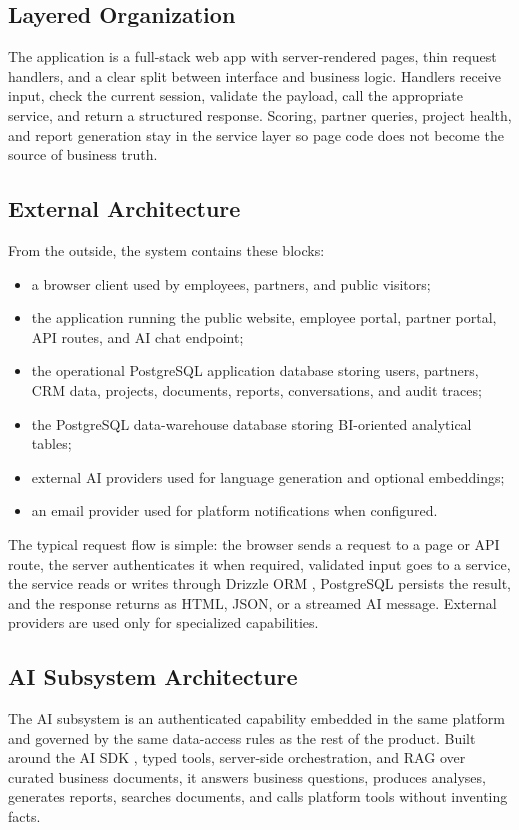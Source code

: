 \subsection{Layered Organization}
The application is a full-stack web app with server-rendered pages, thin request handlers, and a clear split between interface and business logic. Handlers receive input, check the current session, validate the payload, call the appropriate service, and return a structured response. Scoring, partner queries, project health, and report generation stay in the service layer so page code does not become the source of business truth.
\subsection{External Architecture}
From the outside, the system contains these blocks:

\begin{itemize}
  \item a browser client used by employees, partners, and public visitors;
  \item the  application running the public website, employee portal, partner portal, API routes, and AI chat endpoint;
  \item the operational PostgreSQL application database storing users, partners, CRM data, projects, documents, reports, conversations, and audit traces;
  \item the PostgreSQL data-warehouse database storing BI-oriented analytical tables;
  \item external AI providers used for language generation and optional embeddings;
  \item an email provider used for platform notifications when configured.
\end{itemize}
The typical request flow is simple: the browser sends a request to a page or API route, the server authenticates it when required, validated input goes to a service, the service reads or writes through Drizzle ORM , PostgreSQL  persists the result, and the response returns as HTML, JSON, or a streamed AI message. External providers are used only for specialized capabilities.
\subsection{AI Subsystem Architecture}
The AI subsystem is an authenticated capability embedded in the same platform and governed by the same data-access rules as the rest of the product. Built around the AI SDK , typed tools, server-side orchestration, and RAG over curated business documents, it answers business questions, produces analyses, generates reports, searches documents, and calls platform tools without inventing facts.

